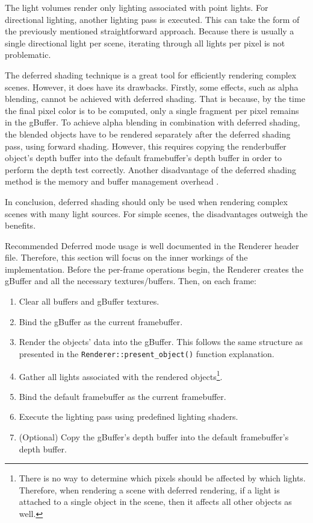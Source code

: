 \documentclass[
  digital,     %
  oneside,     %
  nosansbold,  %
  nocolorbold, %
  lof,         %
  lot,         %
]{fithesis4}
\begin{document}
The light volumes render only lighting associated with point lights. For directional lighting,
another lighting pass is executed. This can take the form of the previously mentioned straightforward approach.
Because there is usually a single directional light per scene, iterating through all lights per pixel
is not problematic.

The deferred shading technique is a great tool for efficiently rendering complex scenes. However, it does have its drawbacks.
Firstly, some effects, such as alpha blending, cannot be achieved with deferred shading. That is because, by the time
the final pixel color is to be computed, only a single fragment per pixel remains in the gBuffer. To achieve
alpha blending in combination with deferred shading, the blended objects have to be rendered separately after
the deferred shading pass, using forward shading. However, this requires copying the renderbuffer object's depth
buffer into the default framebuffer's depth buffer in order to perform the depth test correctly. Another
disadvantage of the deferred shading method is the memory and buffer management overhead \cite{learnopengl-deferred}.

In conclusion, deferred shading should only be used when rendering complex scenes with many light sources.
For simple scenes, the disadvantages outweigh the benefits.

Recommended Deferred mode usage is well documented in the Renderer header file. Therefore, this section will focus on the inner workings
of the implementation. Before the per-frame operations begin,
the Renderer creates the gBuffer and all the necessary textures/buffers. Then, on each frame:
\begin{enumerate}
    \item Clear all buffers and gBuffer textures.
    
    \item Bind the gBuffer as the current framebuffer.
    
    \item Render the objects' data into the gBuffer. This follows the same structure as presented in the
    \verb|Renderer::present_object()| function explanation.

    \item Gather all lights associated with the rendered objects\footnote{There is no way to determine
    which pixels should be affected by which lights. Therefore, when rendering a scene with deferred rendering,
    if a light is attached to a single object in the scene, then it affects all other objects as well.}.

    \item Bind the default framebuffer as the current framebuffer.

    \item Execute the lighting pass using predefined lighting shaders.

    \item (Optional) Copy the gBuffer's depth buffer into the default framebuffer's depth buffer.
\end{enumerate}
\end{document}

